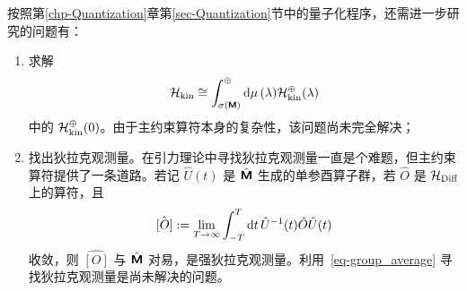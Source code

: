 
		按照第\ref{chp-Quantization}章第\ref{sec-Quantization}节中的量子化程序，还需进一步研究的问题有：
		\begin{enumerate}
			\item 求解
			\begin{equation}
				\mathcal{H}_{\text{kin}} \cong \int_{\sigma(\bm{\mathsf{M}})}^{\oplus} \dd{\mu}(\lambda) \mathcal{H}_{\text{kin}}^\oplus(\lambda)
			\end{equation}
			中的 $\mathcal{H}_{\text{kin}}^\oplus(0)$。由于主约束算符本身的复杂性，该问题尚未完全解决；
			\item 找出狄拉克观测量。在引力理论中寻找狄拉克观测量一直是个难题，但主约束算符提供了一条道路。若记 $\hat{U}(t)$ 是 $\hat{\bm{\mathsf{M}}}$ 生成的单参酉算子群，若 $\hat{O}$ 是 $\mathcal{H}_{\text{Diff}}$ 上的算符，且
			\begin{equation}
				\hat{[O]}:= \lim_{T\rightarrow \infty} \int_{-T}^T \dd{t} \hat{U}^{-1}(t) \hat{O} \hat{U}(t)\label{eq-group_average}
			\end{equation}
			收敛，则 $\hat{[O]}$ 与 $\hat{\bm{\mathsf{M}}}$ 对易，是强狄拉克观测量。利用~\eqref{eq-group_average} 寻找狄拉克观测量是尚未解决的问题。
		\end{enumerate}
